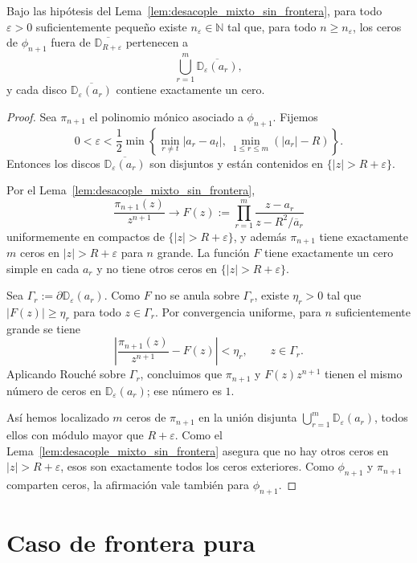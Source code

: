 \begin{thm}\label{thm:atraccion_mixta_sin_frontera}
	Bajo las hipótesis del Lema~\ref{lem:desacople_mixto_sin_frontera}, para todo $\varepsilon>0$ suficientemente pequeño existe $n_\varepsilon\in\mathbb{N}$ tal que, para todo $n\ge n_\varepsilon$, los ceros de $\phi_{n+1}$ fuera de $\overline{\mathbb D_{R+\varepsilon}}$ pertenecen a
	\[
		\bigcup_{r=1}^m\overline{\mathbb D_\varepsilon(a_r)},
	\]
	y cada disco $\overline{\mathbb D_\varepsilon(a_r)}$ contiene exactamente un cero.
\end{thm}

\begin{proof}
	Sea $\pi_{n+1}$ el polinomio mónico asociado a $\phi_{n+1}$. Fijemos
	\[
		0<\varepsilon<\frac12\min\left\{\min_{r\ne t}|a_r-a_t|,\ \min_{1\le r\le m}(|a_r|-R)\right\}.
	\]
	Entonces los discos $\overline{\mathbb D_\varepsilon(a_r)}$ son disjuntos y están contenidos en $\{|z|>R+\varepsilon\}$.

	Por el Lema~\ref{lem:desacople_mixto_sin_frontera},
	\[
		\frac{\pi_{n+1}(z)}{z^{n+1}}
		\longrightarrow
		F(z):=\prod_{r=1}^m\frac{z-a_r}{z-R^2/\overline a_r}
	\]
	uniformemente en compactos de $\{|z|>R+\varepsilon\}$, y además $\pi_{n+1}$ tiene exactamente $m$ ceros en $|z|>R+\varepsilon$ para $n$ grande. La función $F$ tiene exactamente un cero simple en cada $a_r$ y no tiene otros ceros en $\{|z|>R+\varepsilon\}$.

	Sea $\Gamma_r:=\partial\mathbb D_\varepsilon(a_r)$. Como $F$ no se anula sobre $\Gamma_r$, existe $\eta_r>0$ tal que $|F(z)|\ge\eta_r$ para todo $z\in\Gamma_r$. Por convergencia uniforme, para $n$ suficientemente grande se tiene
	\[
		\left|\frac{\pi_{n+1}(z)}{z^{n+1}}-F(z)\right|<\eta_r,
		\qquad z\in\Gamma_r.
	\]
	Aplicando Rouché sobre $\Gamma_r$, concluimos que $\pi_{n+1}$ y $F(z)z^{n+1}$ tienen el mismo número de ceros en $\mathbb D_\varepsilon(a_r)$; ese número es $1$.

	Así hemos localizado $m$ ceros de $\pi_{n+1}$ en la unión disjunta $\bigcup_{r=1}^m\mathbb D_\varepsilon(a_r)$, todos ellos con módulo mayor que $R+\varepsilon$. Como el Lema~\ref{lem:desacople_mixto_sin_frontera} asegura que no hay otros ceros en $|z|>R+\varepsilon$, esos son exactamente todos los ceros exteriores. Como $\phi_{n+1}$ y $\pi_{n+1}$ comparten ceros, la afirmación vale también para $\phi_{n+1}$.
\end{proof}

\section{Caso de frontera pura}

